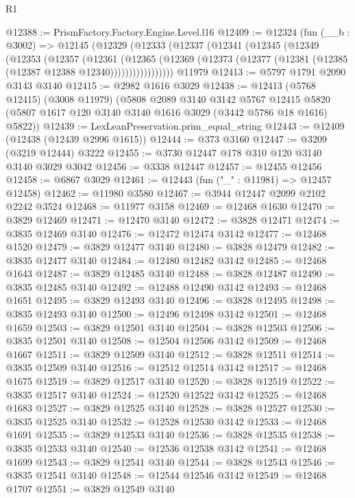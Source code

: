 \begin{lexlean}{R1}
\begin{coremodule}
@12388 := PrismFactory.Factory.Engine.Level.l16
@12409 := @12324
    (fun (__b : @3002) =>
    @12145
      (@12329
        (@12333
          (@12337
            (@12341
              (@12345
                (@12349
                  (@12353
                    (@12357
                      (@12361
                        (@12365
                          (@12369
                            (@12373 (@12377 (@12381 (@12385 (@12387 @12388 @12340)))))))))))))))))
    @11979
@12413 := @5797 @1791 @2090 @3143 @3140
@12415 := @2982 @1616 @3029
@12438 := @12413
    (@5768 @12415)
    (@3008 @11979)
    (@5808
      @2089
      @3140
      @3142
      @5767
      @12415
      @5820
      (@5807 @1617 @120 @3140 @3140 @1616 @3029 (@3442 @5786 @18 @1616) @5822))
@12439 := LexLeanPreservation.prim_equal_string
@12443 := @12409 (@12438 (@12439 @2996 @1615))
@12444 := @373 @3160
@12447 := @3209 (@3219 @12444) @3222
@12455 := @3730 @12447 @178 @310 @120 @3140 @3140 @3029 @3042
@12456 := @3338 @12447
@12457 := @12455 @12456
@12458 := @6867 @3029
@12461 := @12443 (fun ("_" : @11981) => @12457 @12458)
@12462 := @11980 @3580
@12467 := @3944 @12447 @2099 @2102 @2242 @3524
@12468 := @11977 @3158
@12469 := @12468 @1630
@12470 := @3829 @12469
@12471 := @12470 @3140
@12472 := @3828 @12471
@12474 := @3835 @12469 @3140
@12476 := @12472 @12474 @3142
@12477 := @12468 @1520
@12479 := @3829 @12477 @3140
@12480 := @3828 @12479
@12482 := @3835 @12477 @3140
@12484 := @12480 @12482 @3142
@12485 := @12468 @1643
@12487 := @3829 @12485 @3140
@12488 := @3828 @12487
@12490 := @3835 @12485 @3140
@12492 := @12488 @12490 @3142
@12493 := @12468 @1651
@12495 := @3829 @12493 @3140
@12496 := @3828 @12495
@12498 := @3835 @12493 @3140
@12500 := @12496 @12498 @3142
@12501 := @12468 @1659
@12503 := @3829 @12501 @3140
@12504 := @3828 @12503
@12506 := @3835 @12501 @3140
@12508 := @12504 @12506 @3142
@12509 := @12468 @1667
@12511 := @3829 @12509 @3140
@12512 := @3828 @12511
@12514 := @3835 @12509 @3140
@12516 := @12512 @12514 @3142
@12517 := @12468 @1675
@12519 := @3829 @12517 @3140
@12520 := @3828 @12519
@12522 := @3835 @12517 @3140
@12524 := @12520 @12522 @3142
@12525 := @12468 @1683
@12527 := @3829 @12525 @3140
@12528 := @3828 @12527
@12530 := @3835 @12525 @3140
@12532 := @12528 @12530 @3142
@12533 := @12468 @1691
@12535 := @3829 @12533 @3140
@12536 := @3828 @12535
@12538 := @3835 @12533 @3140
@12540 := @12536 @12538 @3142
@12541 := @12468 @1699
@12543 := @3829 @12541 @3140
@12544 := @3828 @12543
@12546 := @3835 @12541 @3140
@12548 := @12544 @12546 @3142
@12549 := @12468 @1707
@12551 := @3829 @12549 @3140

\end{coremodule}
\end{lexlean}
